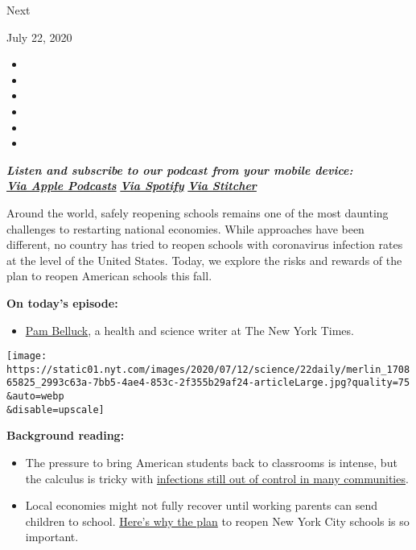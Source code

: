 Next

July 22, 2020

\begin{itemize}
\item
\item
\item
\item
\item
\item
\end{itemize}

\emph{\textbf{Listen and subscribe to our podcast from your mobile
device:}}\\
\textbf{\href{https://itunes.apple.com/us/podcast/the-daily/id1200361736?mt=2}{\emph{Via
Apple Podcasts}}} \emph{\textbf{\textbar{}}}
\textbf{\href{https://open.spotify.com/show/3IM0lmZxpFAY7CwMuv9H4g?si=SfuMSC55R1qprFsRZU3_zw}{\emph{Via
Spotify}}} \emph{\textbf{\textbar{}}}
\textbf{\href{http://www.stitcher.com/podcast/the-new-york-times/the-daily-10}{\emph{Via
Stitcher}}}

Around the world, safely reopening schools remains one of the most
daunting challenges to restarting national economies. While approaches
have been different, no country has tried to reopen schools with
coronavirus infection rates at the level of the United States. Today, we
explore the risks and rewards of the plan to reopen American schools
this fall.

\textbf{On today's episode:}

\begin{itemize}
\tightlist
\item
  \href{https://www.nytimes.com/by/pam-belluck}{Pam Belluck}, a health
  and science writer at The New York Times.
\end{itemize}

\texttt{[image: https://static01.nyt.com/images/2020/07/12/science/22daily/merlin\_170865825\_2993c63a-7bb5-4ae4-853c-2f355b29af24-articleLarge.jpg?quality=75\\\&auto=webp\\\&disable=upscale]}

\textbf{Background reading:}

\begin{itemize}
\item
  The pressure to bring American students back to classrooms is intense,
  but the calculus is tricky with
  \href{https://www.nytimes.com/2020/07/11/health/coronavirus-schools-reopen.html}{infections
  still out of control in many communities}.
\item
  Local economies might not fully recover until working parents can send
  children to school.
  \href{https://www.nytimes.com/2020/07/06/nyregion/nyc-school-reopening-plan.html}{Here's
  why the plan} to reopen New York City schools is so important.
\end{itemize}


